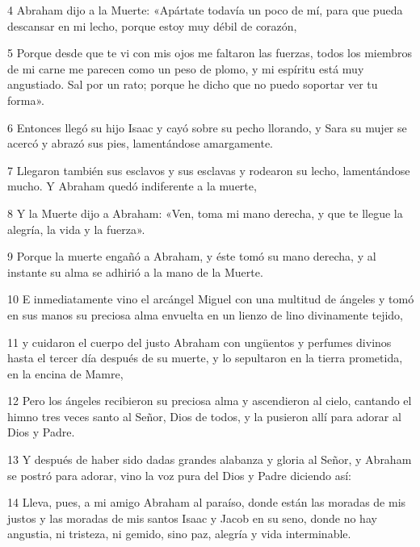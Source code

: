 \par 4 Abraham dijo a la Muerte: «Apártate todavía un poco de mí, para que pueda descansar en mi lecho, porque estoy muy débil de corazón,

\par 5 Porque desde que te vi con mis ojos me faltaron las fuerzas, todos los miembros de mi carne me parecen como un peso de plomo, y mi espíritu está muy angustiado. Sal por un rato; porque he dicho que no puedo soportar ver tu forma».

\par 6 Entonces llegó su hijo Isaac y cayó sobre su pecho llorando, y Sara su mujer se acercó y abrazó sus pies, lamentándose amargamente.

\par 7 Llegaron también sus esclavos y sus esclavas y rodearon su lecho, lamentándose mucho. Y Abraham quedó indiferente a la muerte,

\par 8 Y la Muerte dijo a Abraham: «Ven, toma mi mano derecha, y que te llegue la alegría, la vida y la fuerza».

\par 9 Porque la muerte engañó a Abraham, y éste tomó su mano derecha, y al instante su alma se adhirió a la mano de la Muerte.

\par 10 E inmediatamente vino el arcángel Miguel con una multitud de ángeles y tomó en sus manos su preciosa alma envuelta en un lienzo de lino divinamente tejido,

\par 11 y cuidaron el cuerpo del justo Abraham con ungüentos y perfumes divinos hasta el tercer día después de su muerte, y lo sepultaron en la tierra prometida, en la encina de Mamre,

\par 12 Pero los ángeles recibieron su preciosa alma y ascendieron al cielo, cantando el himno tres veces santo al Señor, Dios de todos, y la pusieron allí para adorar al Dios y Padre.

\par 13 Y después de haber sido dadas grandes alabanza y gloria al Señor, y Abraham se postró para adorar, vino la voz pura del Dios y Padre diciendo así:

\par 14 Lleva, pues, a mi amigo Abraham al paraíso, donde están las moradas de mis justos y las moradas de mis santos Isaac y Jacob en su seno, donde no hay angustia, ni tristeza, ni gemido, sino paz, alegría y vida interminable.

